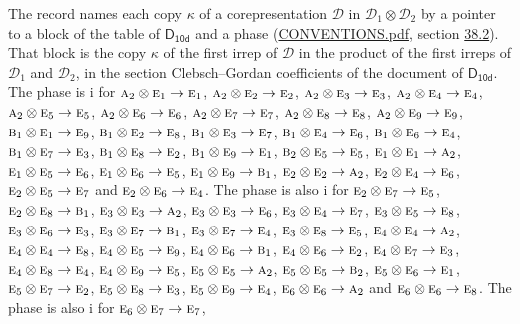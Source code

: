 \documentclass[10pt,a4paper]{article}
\numberwithin{equation}{section}
\newcommand{\grp}[1]{\mathsf{#1}}
\newcommand{\irr}[1]{\text{\normalfont\scshape #1}}
\newcommand{\iunit}{\mathrm{i}}
\newcommand{\irrprod}{\otimes}
\newcommand{\mult}{\kappa}
\begin{document}
\leavevmode\label{n:index.copy}The record names each copy $\mult$ of a corepresentation $\mathcal{D}$ in $\mathcal{D}_1\irrprod\mathcal{D}_2$ by a pointer to a block of the table of $\grp{D_{10d}}$ and a phase (\href{../../CONVENTIONS.pdf}{CONVENTIONS.pdf}, section \href{../../CONVENTIONS.pdf\#conv.38.2}{38.2}). That block is the copy $\mult$ of the first irrep of $\mathcal{D}$ in the product of the first irreps of $\mathcal{D}_1$ and $\mathcal{D}_2$, in the section Clebsch--Gordan coefficients of the document of \href{../../../rotation/data/pdf/D10d.pdf}{$\grp{D_{10d}}$}. The phase is $\iunit$ for $\irr{a}_{2}\irrprod \irr{e}_{1}\to \irr{e}_{1}$, $\irr{a}_{2}\irrprod \irr{e}_{2}\to \irr{e}_{2}$, $\irr{a}_{2}\irrprod \irr{e}_{3}\to \irr{e}_{3}$, $\irr{a}_{2}\irrprod \irr{e}_{4}\to \irr{e}_{4}$, $\irr{a}_{2}\irrprod \irr{e}_{5}\to \irr{e}_{5}$, $\irr{a}_{2}\irrprod \irr{e}_{6}\to \irr{e}_{6}$, $\irr{a}_{2}\irrprod \irr{e}_{7}\to \irr{e}_{7}$, $\irr{a}_{2}\irrprod \irr{e}_{8}\to \irr{e}_{8}$, $\irr{a}_{2}\irrprod \irr{e}_{9}\to \irr{e}_{9}$, $\irr{b}_{1}\irrprod \irr{e}_{1}\to \irr{e}_{9}$, $\irr{b}_{1}\irrprod \irr{e}_{2}\to \irr{e}_{8}$, $\irr{b}_{1}\irrprod \irr{e}_{3}\to \irr{e}_{7}$, $\irr{b}_{1}\irrprod \irr{e}_{4}\to \irr{e}_{6}$, $\irr{b}_{1}\irrprod \irr{e}_{6}\to \irr{e}_{4}$, $\irr{b}_{1}\irrprod \irr{e}_{7}\to \irr{e}_{3}$, $\irr{b}_{1}\irrprod \irr{e}_{8}\to \irr{e}_{2}$, $\irr{b}_{1}\irrprod \irr{e}_{9}\to \irr{e}_{1}$, $\irr{b}_{2}\irrprod \irr{e}_{5}\to \irr{e}_{5}$, $\irr{e}_{1}\irrprod \irr{e}_{1}\to \irr{a}_{2}$, $\irr{e}_{1}\irrprod \irr{e}_{5}\to \irr{e}_{6}$, $\irr{e}_{1}\irrprod \irr{e}_{6}\to \irr{e}_{5}$, $\irr{e}_{1}\irrprod \irr{e}_{9}\to \irr{b}_{1}$, $\irr{e}_{2}\irrprod \irr{e}_{2}\to \irr{a}_{2}$, $\irr{e}_{2}\irrprod \irr{e}_{4}\to \irr{e}_{6}$, $\irr{e}_{2}\irrprod \irr{e}_{5}\to \irr{e}_{7}$ and $\irr{e}_{2}\irrprod \irr{e}_{6}\to \irr{e}_{4}$. The phase is also $\iunit$ for $\irr{e}_{2}\irrprod \irr{e}_{7}\to \irr{e}_{5}$, $\irr{e}_{2}\irrprod \irr{e}_{8}\to \irr{b}_{1}$, $\irr{e}_{3}\irrprod \irr{e}_{3}\to \irr{a}_{2}$, $\irr{e}_{3}\irrprod \irr{e}_{3}\to \irr{e}_{6}$, $\irr{e}_{3}\irrprod \irr{e}_{4}\to \irr{e}_{7}$, $\irr{e}_{3}\irrprod \irr{e}_{5}\to \irr{e}_{8}$, $\irr{e}_{3}\irrprod \irr{e}_{6}\to \irr{e}_{3}$, $\irr{e}_{3}\irrprod \irr{e}_{7}\to \irr{b}_{1}$, $\irr{e}_{3}\irrprod \irr{e}_{7}\to \irr{e}_{4}$, $\irr{e}_{3}\irrprod \irr{e}_{8}\to \irr{e}_{5}$, $\irr{e}_{4}\irrprod \irr{e}_{4}\to \irr{a}_{2}$, $\irr{e}_{4}\irrprod \irr{e}_{4}\to \irr{e}_{8}$, $\irr{e}_{4}\irrprod \irr{e}_{5}\to \irr{e}_{9}$, $\irr{e}_{4}\irrprod \irr{e}_{6}\to \irr{b}_{1}$, $\irr{e}_{4}\irrprod \irr{e}_{6}\to \irr{e}_{2}$, $\irr{e}_{4}\irrprod \irr{e}_{7}\to \irr{e}_{3}$, $\irr{e}_{4}\irrprod \irr{e}_{8}\to \irr{e}_{4}$, $\irr{e}_{4}\irrprod \irr{e}_{9}\to \irr{e}_{5}$, $\irr{e}_{5}\irrprod \irr{e}_{5}\to \irr{a}_{2}$, $\irr{e}_{5}\irrprod \irr{e}_{5}\to \irr{b}_{2}$, $\irr{e}_{5}\irrprod \irr{e}_{6}\to \irr{e}_{1}$, $\irr{e}_{5}\irrprod \irr{e}_{7}\to \irr{e}_{2}$, $\irr{e}_{5}\irrprod \irr{e}_{8}\to \irr{e}_{3}$, $\irr{e}_{5}\irrprod \irr{e}_{9}\to \irr{e}_{4}$, $\irr{e}_{6}\irrprod \irr{e}_{6}\to \irr{a}_{2}$ and $\irr{e}_{6}\irrprod \irr{e}_{6}\to \irr{e}_{8}$. The phase is also $\iunit$ for $\irr{e}_{6}\irrprod \irr{e}_{7}\to \irr{e}_{7}$, 
\end{document}
